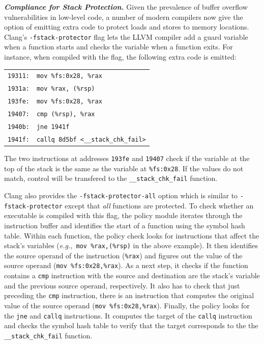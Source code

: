 \documentclass[conference,compsoc]{IEEEtran}
\newcommand{\myparagraph}[1]{\parskip -4pt \indent\par\noindent\textbf{\textit{#1}} \parskip 0pt}
\newcommand{\code}[1]{{\tt \footnotesize #1}}
\newcommand{\eg}{\textit{e.g.,}\xspace}
\begin{document}
\renewcommand{\baselinestretch}{0.9}
\myparagraph{Compliance for Stack Protection.}
%
Given the prevalence of buffer overflow vulnerabilities in low-level code, a
number of modern compilers now give the option of emitting extra code to
protect loads and stores to memory locations. Clang's \code{-fstack-protector}
flag lets the LLVM compiler add a guard variable when a function starts and
checks the variable when a function exits. For instance, when compiled with the
flag, the following extra code is emitted:

\begin{center}
\footnotesize{
\begin{tabular}{ll}
\code{19311:} & \code{mov    \%fs:0x28, \%rax}\\
\code{1931a:} & \code{mov    \%rax, (\%rsp)}\\
\code{193fe:} & \code{mov    \%fs:0x28, \%rax}\\
\code{19407:} & \code{cmp    (\%rsp), \%rax}\\
\code{1940b:} & \code{jne    1941f}\\
\code{1941f:} & \code{callq  8d5bf <\_\_stack\_chk\_fail>}\\
\end{tabular}}
\end{center}

The two instructions at addresses \code{193fe} and \code{19407} check if the
variable at the top of the stack is the same as the variable at
\code{\%fs:0x28}. If the values do not match, control will be transfered to the
\code{\_\_stack\_chk\_fail} function.

Clang also provides the \code{-fstack-protector-all} option which is similar to
\code{-fstack-protector} except that \textit{all} functions are protected. To
check whether an executable is compiled with this flag, the policy module
iterates through the instruction buffer and identifies the start of a function
using the symbol hash table. Within each function, the policy check looks for
instructions that affect the stack's variables (\eg~\code{mov \%rax,(\%rsp)} in
the above example). It then identifies the source operand of the instruction
(\code{\%rax}) and figures out the value of the source operand (\code{mov
\%fs:0x28,\%rax}).  As a next step, it checks if the function contains a
\code{cmp} instruction with the source and destination are the stack's variable
and the previous source operand, respectively. It also has to check that just
preceding the \code{cmp} instruction, there is an instruction that computes the
original value of the source operand (\code{mov \%fs:0x28,\%rax}). Finally, the
policy looks for the \code{jne} and \code{callq} instructions. It computes the
target of the \code{callq} instruction and checks the symbol hash table to
verify that the target corresponds to the the \code{\_\_stack\_chk\_fail}
function.
\end{document}

